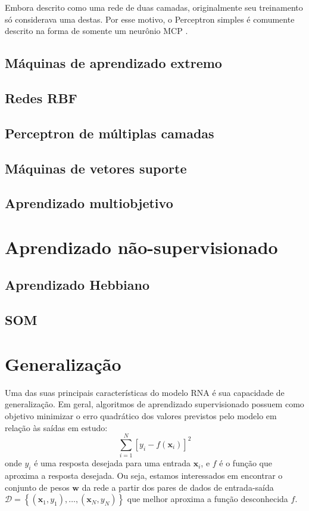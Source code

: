 \documentclass[conference]{IEEEtran}
\begin{document}
	Embora descrito como uma rede de duas camadas, originalmente seu treinamento só considerava uma destas. Por esse motivo, o Perceptron simples é comumente descrito na forma de somente um neurônio MCP \cite{mcculloch1943logical}.  
	
	

	\subsection{Máquinas de aprendizado extremo}
	\subsection{Redes RBF}
	\subsection{Perceptron de múltiplas camadas}
	\subsection{Máquinas de vetores suporte}
	\subsection{Aprendizado multiobjetivo}
	\section{Aprendizado não-supervisionado}
	\subsection{Aprendizado Hebbiano}
	\subsection{SOM}


	\section{Generalização}
	 Uma das suas principais características do modelo RNA é sua capacidade de generalização.  Em geral, algoritmos de aprendizado supervisionado possuem como objetivo minimizar o erro quadrático dos valores previstos pelo modelo em relação às saídas em estudo:
	 \begin{equation}
	 	\sum_{i=1}^{N} [y_i - f(\mathbf{x}_i)]^2
	 	\label{eq:sqrd}
	 \end{equation}
	 onde $y_i$ é uma resposta desejada para uma entrada $\mathbf{x}_i$, e $f$ é o função que aproxima a resposta desejada. Ou seja, estamos interessados em encontrar o conjunto de pesos $\mathbf{w}$ da rede a partir dos pares de dados de entrada-saída $\mathcal{D} = \left\lbrace (\mathbf{x}_1, y_1), \dots, (\mathbf{x}_N, y_N)\right\rbrace $ que melhor aproxima a função desconhecida $f$.
	 
\end{document}
